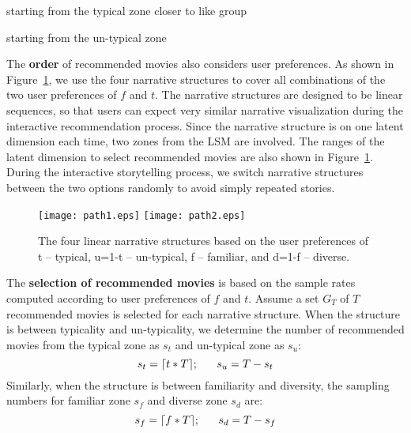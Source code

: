 \documentclass{vgtc}                          %
\begin{document}
\vspace{+1mm}
 starting from the typical zone closer to like group

\vspace{+1mm}
 starting from the un-typical zone
\vspace{+1mm}

The \textbf{order} of recommended movies also considers user preferences.
As shown in Figure~\ref{path}, we use the four narrative structures
to cover all combinations of the two user preferences of $f$ and $t$.
The narrative structures are designed to be linear sequences, so that users can expect very similar narrative visualization during the interactive recommendation process.
Since the narrative structure is on one latent dimension each time, two zones from the LSM are involved.
The ranges of the latent dimension to select recommended movies are also shown in Figure~\ref{path}.
During the interactive storytelling process, we switch narrative structures between the two options randomly to avoid simply repeated stories.


\begin{figure}
\centering
\texttt{[image: path1.eps]}
\texttt{[image: path2.eps]}\\
\caption{The four linear narrative structures based on the user preferences of t -- typical, u=1-t -- un-typical, f -- familiar, and d=1-f -- diverse. 
}
\label{path}
\end{figure}

The \textbf{selection of recommended movies} is based on the sample rates computed according to user preferences of $f$ and $t$.
Assume a set $G_T$ of $T$ recommended movies is selected for each narrative structure.
When the structure is between typicality and un-typicality, we determine the number of recommended movies from the typical zone as $s_t$ and un-typical zone as $s_{u}$:
\begin{equation}
\centering
s_t = \lceil t * T \rceil; \ \ \ \ \ 
s_{u} = T - s_t
\end{equation}
Similarly, when the structure is between familiarity and diversity, the sampling numbers for familiar zone $s_f$ and diverse zone $s_d$ are: 
\begin{equation}
\centering
s_f = \lceil f * T \rceil; \ \ \ \ \ 
s_d = T - s_f
\end{equation}
\end{document}
